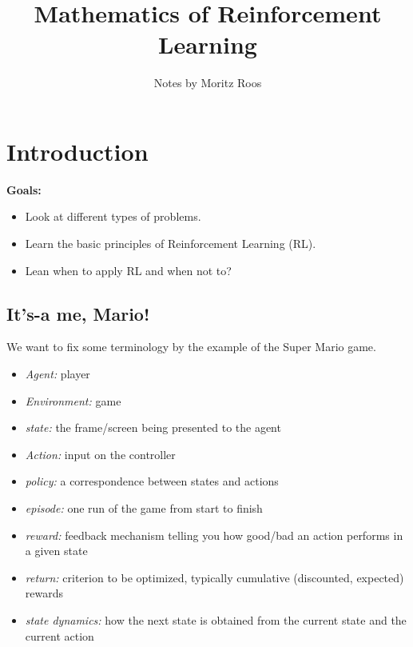 







\title{Mathematics of Reinforcement Learning}

\author{Notes by Moritz Roos}
\date{}

\maketitle

\tableofcontents


\clearpage
\section{Introduction}
\textbf{Goals:}
\begin{itemize}
    \item Look at different types of problems.
    \item Learn the basic principles of Reinforcement Learning (RL).
    \item Lean when to apply RL and when not to?
\end{itemize}

\subsection{It's-a me, Mario!}
We want to fix some terminology by the example of the Super Mario game.
\begin{itemize}
    \item \emph{Agent:} player
    \item \emph{Environment:} game
    \item \emph{state:} the frame/screen being presented to the agent
    \item \emph{Action:} input on the controller
    \item \emph{policy:} a correspondence between states and actions
    \item \emph{episode:} one run of the game from start to finish
    \item \emph{reward:} feedback mechanism telling you how good/bad an action performs in a given state
    \item \emph{return:} criterion to be optimized, typically cumulative (discounted, expected) rewards
    \item \emph{state dynamics:} how the next state is obtained from the current state and the current action
\end{itemize}


